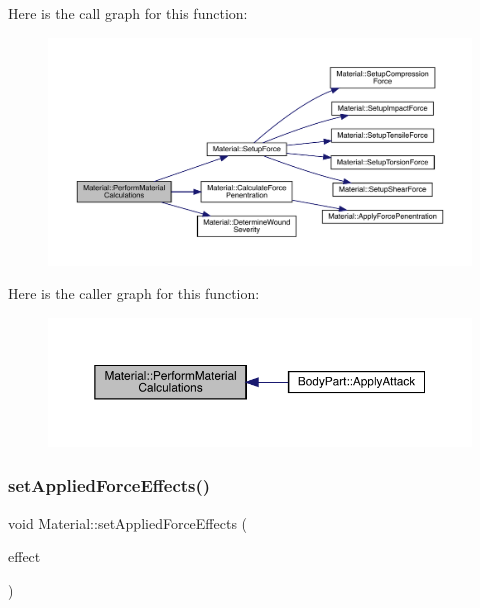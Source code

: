 Here is the call graph for this function\+:
\nopagebreak
\begin{figure}[H]
\begin{center}
\leavevmode
\includegraphics[width=350pt]{class_material_a9340d9854962d09d685b9638be093fa5_cgraph}
\end{center}
\end{figure}
Here is the caller graph for this function\+:
\nopagebreak
\begin{figure}[H]
\begin{center}
\leavevmode
\includegraphics[width=350pt]{class_material_a9340d9854962d09d685b9638be093fa5_icgraph}
\end{center}
\end{figure}
\mbox{\label{class_material_a0d32999bbe6a954cee51da67f78d5c51}} 
\subsubsection{\texorpdfstring{set\+Applied\+Force\+Effects()}{setAppliedForceEffects()}}
{\footnotesize\ttfamily void Material\+::set\+Applied\+Force\+Effects (\begin{DoxyParamCaption}\item[{\mbox{\hyperlink{struct_applied_force_effect}{Applied\+Force\+Effect}}}]{effect }\end{DoxyParamCaption})}

